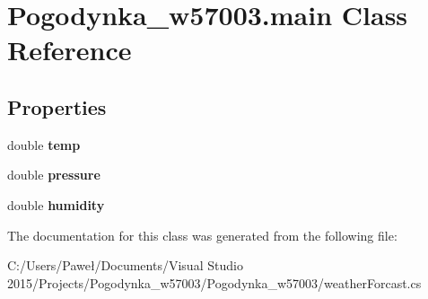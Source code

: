 \hypertarget{class_pogodynka__w57003_1_1main}{}\section{Pogodynka\+\_\+w57003.\+main Class Reference}
\label{class_pogodynka__w57003_1_1main}
\subsection*{Properties}
\begin{DoxyCompactItemize}
\item 
\mbox{\label{class_pogodynka__w57003_1_1main_a17f39b6d6da5d6d247bcd4d209b4f226}} 
double {\bfseries temp}
\item 
\mbox{\label{class_pogodynka__w57003_1_1main_a252f264966164ce699bf14ef40309ba5}} 
double {\bfseries pressure}
\item 
\mbox{\label{class_pogodynka__w57003_1_1main_abc8be82c5bb42bc5442b75aeed0926bb}} 
double {\bfseries humidity}
\end{DoxyCompactItemize}


The documentation for this class was generated from the following file\+:\begin{DoxyCompactItemize}
\item 
C\+:/\+Users/\+Paweł/\+Documents/\+Visual Studio 2015/\+Projects/\+Pogodynka\+\_\+w57003/\+Pogodynka\+\_\+w57003/weather\+Forcast.\+cs\end{DoxyCompactItemize}

